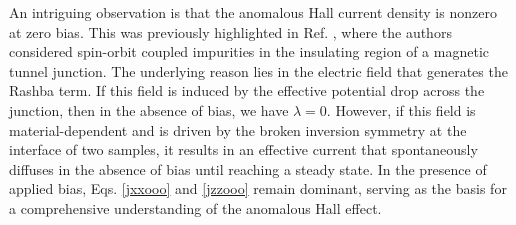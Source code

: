 \documentclass[10pt,pr,twocolumn,showpacs,amssymb,floatfix,superscriptaddress]{revtex4-1}
\begin{document}
An intriguing observation is that the anomalous Hall current density is nonzero at zero bias. This was previously highlighted in Ref. , where the authors considered spin-orbit coupled impurities in the insulating region of a magnetic tunnel junction. The underlying reason lies in the electric field that generates the Rashba term. If this field is induced by the effective potential drop across the junction, then in the absence of bias, we have  $\lambda = 0$. However, if this field is material-dependent and is driven by the broken inversion symmetry at the interface of two samples, it results in an effective current that spontaneously diffuses in the absence of bias until reaching a steady state. In the presence of applied bias, Eqs. \eqref{jxxooo} and \eqref{jzzooo} remain dominant, serving as the basis for a comprehensive understanding of the anomalous Hall effect.
\end{document}
